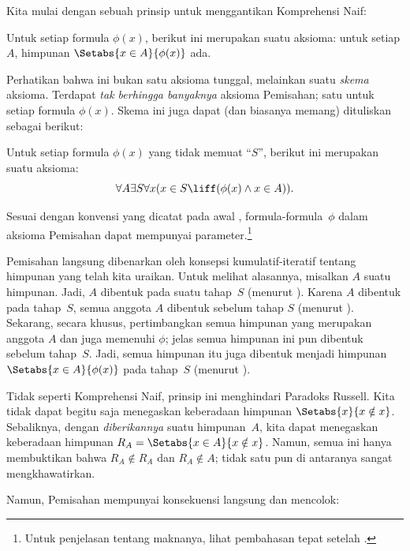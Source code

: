 \documentclass[../../../include/open-logic-section]{subfiles}
\begin{document}

Kita mulai dengan sebuah prinsip untuk menggantikan Komprehensi Naif:

\begin{axiom} Untuk setiap formula $\phi(x)$, berikut ini
merupakan suatu aksioma: untuk setiap $A$, himpunan
$\Setabs{x \in A}{\phi(x)}$ ada.
\end{axiom}

Perhatikan bahwa ini bukan satu aksioma tunggal, melainkan suatu
\emph{skema} aksioma. Terdapat \emph{tak berhingga banyaknya} aksioma
Pemisahan; satu untuk setiap formula $\phi(x)$. Skema ini juga dapat (dan
biasanya memang) dituliskan sebagai berikut:

\begin{defish}
Untuk setiap formula $\phi(x)$ yang tidak memuat ``$S$'', berikut ini
merupakan suatu aksioma:
\[
	\forall A \exists S \forall x(x \in S \liff (\phi(x) \land x \in A)).
\]
\end{defish}

Sesuai dengan konvensi yang dicatat pada awal ,
formula-formula~$\phi$ dalam aksioma Pemisahan dapat mempunyai
parameter.\footnote{Untuk penjelasan tentang maknanya, lihat pembahasan tepat
setelah .}

Pemisahan langsung dibenarkan oleh konsepsi kumulatif-iteratif tentang
himpunan yang telah kita uraikan. Untuk melihat alasannya, misalkan $A$
suatu himpunan. Jadi, $A$ dibentuk pada suatu tahap~$S$ (menurut
\stageshier). Karena $A$ dibentuk pada tahap~$S$, semua anggota $A$ dibentuk
sebelum tahap $S$ (menurut \stagesacc). Sekarang, secara khusus,
pertimbangkan semua himpunan yang merupakan anggota $A$ dan juga memenuhi
$\phi$; jelas semua himpunan ini pun dibentuk sebelum tahap~$S$. Jadi, semua
himpunan itu juga dibentuk menjadi himpunan
$\Setabs{x \in A}{\phi(x)}$ pada tahap~$S$ (menurut \stagesacc).

Tidak seperti Komprehensi Naif, prinsip ini menghindari Paradoks Russell.
Kita tidak dapat begitu saja menegaskan keberadaan himpunan
$\Setabs{x}{x \notin x}$. Sebaliknya, dengan \emph{diberikannya} suatu
himpunan~$A$, kita dapat menegaskan keberadaan himpunan
$R_A = \Setabs{x \in A}{x \notin x}$. Namun, semua ini hanya membuktikan
bahwa $R_A \notin R_A$ dan $R_A \notin A$; tidak satu pun di antaranya
sangat mengkhawatirkan.

Namun, Pemisahan mempunyai konsekuensi langsung dan mencolok:
\end{document}
